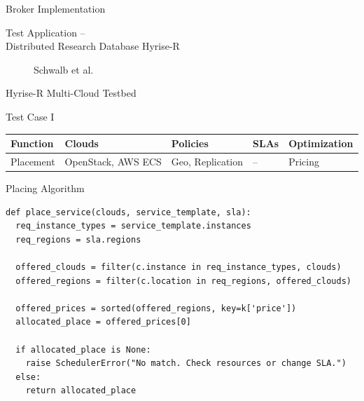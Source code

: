 \documentclass{beamer}
\newcommand{\ra}[1]{\renewcommand{\arraystretch}{#1}}
\begin{document}
\begin{frame}{Broker Implementation}
\begin{figure}
	\def\svgwidth{0.95\textwidth}
	{\tiny \textsf{
			}}
\end{figure}
\end{frame}

\begin{frame}{Test Application –\\Distributed Research Database Hyrise-R}
\begin{figure}
	\def\svgwidth{0.8\textwidth}
	{\tiny \textsf{
			}}
	\caption{{\tiny Schwalb et al. \cite{schwalb:2015:hyrise-r}}}
\end{figure}
\end{frame}


\begin{frame}{Hyrise-R Multi-Cloud Testbed}
\begin{figure}
\def\svgwidth{0.8\textwidth}
{\tiny \textsf{
		}}
\end{figure}
\end{frame}


\begin{frame}{Test Case I}
\vfill
\begin{table}
	\ra{1.3}%
	\begin{tabularx}{\textwidth}{LLLLL}%
		\toprule%
		Function & Clouds & Policies & SLAs & Optimization\\%
		\midrule%
		Placement & OpenStack, AWS ECS & Geo, Replication & -- & Pricing\\%
	\end{tabularx}
\end{table}
\vfill
\end{frame}


\begin{frame}[fragile]{Placing Algorithm}
\begin{verbatim}
def place_service(clouds, service_template, sla):
  req_instance_types = service_template.instances
  req_regions = sla.regions

  offered_clouds = filter(c.instance in req_instance_types, clouds)
  offered_regions = filter(c.location in req_regions, offered_clouds)

  offered_prices = sorted(offered_regions, key=k['price'])
  allocated_place = offered_prices[0]

  if allocated_place is None:
    raise SchedulerError("No match. Check resources or change SLA.")
  else:
    return allocated_place
\end{verbatim}
\end{frame}
\end{document}
